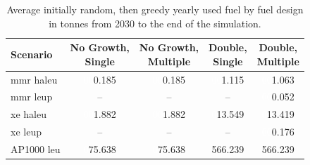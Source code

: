   \begin{table}[H]
    \centering
    \caption{Average initially random, then greedy yearly used fuel by fuel design in tonnes from 2030 to the end of the simulation.}
    \label{tab:rand_greed_used_avg}
    \begin{tabular}{l c c c c}
       \toprule
       Scenario & \shortstack{No Growth,\\ Single} & \shortstack{No Growth,\\ Multiple} & \shortstack{Double,\\ Single} & \shortstack{Double,\\ Multiple}  \\
       \midrule
       \gls{mmr} \gls{haleu}   & \textcolor{white}{00}0.185    & \textcolor{white}{00}0.185   & \textcolor{white}{00}1.115    & \textcolor{white}{00}1.063    \\
       \gls{mmr} \gls{leup}    & --       & --      & --       & \textcolor{white}{00}0.052    \\
       \gls{xe} \gls{haleu}    & \textcolor{white}{00}1.882    & \textcolor{white}{00}1.882   & \textcolor{white}{0}13.549   & \textcolor{white}{0}13.419   \\
       \gls{xe} \gls{leup}     & --       & --      & --       & \textcolor{white}{00}0.176    \\
       AP1000 \gls{leu}        & \textcolor{white}{0}75.638   & \textcolor{white}{0}75.638  & 566.239  & 566.239  \\
       \bottomrule
    \end{tabular}
  \end{table}

